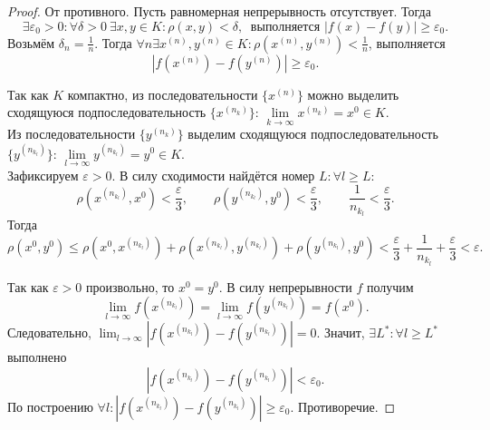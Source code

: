 \documentclass[12pt,a4paper]{report}
\begin{document}
\begin{proof}
    От противного. Пусть равномерная непрерывность отсутствует. Тогда
    \[
    \exists\varepsilon_0>0\colon \forall\delta>0\ \exists x,y\in K\colon \rho(x,y)<\delta,\ \text{ выполняется } |f(x)-f(y)|\ge \varepsilon_0.
    \]
    Возьмём $\delta_n=\frac{1}{n}$. Тогда $\forall n\exists x^{(n)},y^{(n)}\in K \colon \rho(x^{(n)},y^{(n)})<\frac{1}{n}$, выполняется
    \[ 
    |f(x^{(n)})-f(y^{(n)})|\ge \varepsilon_0.
    \]
    
    Так как $K$ компактно, из последовательности $\{x^{(n)}\}$ можно выделить сходящуюся подпоследовательность $\{x^{(n_k)}\}$: $\lim\limits_{k\to\infty} x^{(n_k)}=x^0\in K$. \\
    Из последовательности $\{y^{(n_k)}\}$ выделим сходящуюся подпоследовательность $\{y^{(n_{k_l})}\}$: $\lim\limits_{l\to\infty} y^{(n_{k_l})}=y^0\in K$. \\
    
    Зафиксируем $\varepsilon>0$. В силу сходимости найдётся номер $L\colon \forall l\ge L$:
    \[
    \rho(x^{(n_{k_l})},x^0)<\frac{\varepsilon}{3},\qquad
    \rho(y^{(n_{k_l})},y^0)<\frac{\varepsilon}{3},\qquad
    \frac{1}{n_{k_l}}<\frac{\varepsilon}{3}.
    \]
    Тогда
    \[
    \rho(x^0,y^0)\le \rho(x^0,x^{(n_{k_l})})+\rho(x^{(n_{k_l})},y^{(n_{k_l})})+\rho(y^{(n_{k_l})},y^0)<
    \frac{\varepsilon}{3}+\frac{1}{n_{k_l}}+\frac{\varepsilon}{3}<\varepsilon.
    \]
    
    Так как $\varepsilon>0$ произвольно, то $x^0=y^0$. В силу непрерывности $f$ получим
    \[
    \lim_{l\to\infty} f(x^{(n_{k_l})})=\lim_{l\to\infty} f(y^{(n_{k_l})})=f(x^0).
    \]
    Следовательно, $\lim_{l\to\infty} |f(x^{(n_{k_l})})-f(y^{(n_{k_l})})|=0$. Значит, $\exists L^*\colon \forall l\ge L^*$ выполнено 
    \[ 
    |f(x^{(n_{k_l})})-f(y^{(n_{k_l})})|<\varepsilon_0.
    \]
    По построению $\forall l\colon |f(x^{(n_{k_l})})-f(y^{(n_{k_l})})|\ge \varepsilon_0$. Противоречие.
\end{proof}



\end{document}
